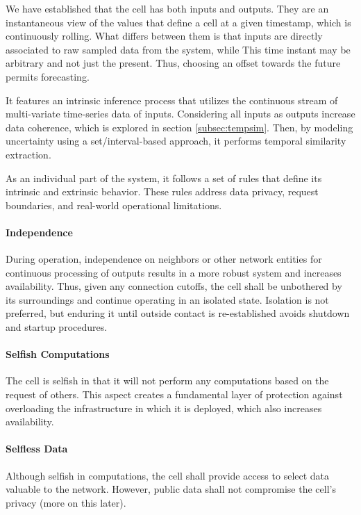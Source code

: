 We have established that the cell has both inputs and outputs. They are an instantaneous view of the values that define a cell at a given timestamp, which is continuously rolling. What differs between them is that inputs are directly associated to raw sampled data from the system, while  This time instant may be arbitrary and not just the present. Thus, choosing an offset towards the future permits forecasting.

It features an intrinsic inference process that utilizes the continuous stream of multi-variate time-series data of inputs. Considering all inputs as outputs increase data coherence, which is explored in section \ref{subsec:tempsim}. Then, by modeling uncertainty using a set/interval-based approach, it performs temporal similarity extraction.

As an individual part of the system, it follows a set of rules that define its intrinsic and extrinsic behavior. These rules address data privacy, request boundaries, and real-world operational limitations.

\paragraph*{Independence} During operation, independence on neighbors or other network entities for continuous processing of outputs results in a more robust system and increases availability. Thus, given any connection cutoffs, the cell shall be unbothered by its surroundings and continue operating in an isolated state. Isolation is not preferred, but enduring it until outside contact is re-established avoids shutdown and startup procedures. 

\paragraph*{Selfish Computations} The cell is selfish in that it will not perform any computations based on the request of others. This aspect creates a fundamental layer of protection against overloading the infrastructure in which it is deployed, which also increases availability.

\paragraph*{Selfless Data} Although selfish in computations, the cell shall provide access to select data valuable to the network. However, public data shall not compromise the cell's privacy (more on this later).


